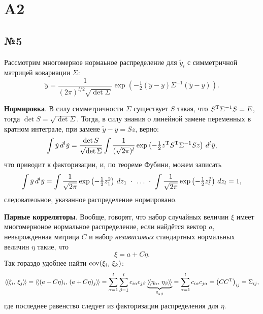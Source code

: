 
\section{A2}

\subsection*{№5}


Рассмотрим многомерное нормаьное распределение для $\tilde{y}_i$ с симметричной матрицей ковариации $\Sigma$:
\begin{equation*}
    \tilde{y} = \frac{1}{(2\pi)^{l/2} \sqrt{\det \Sigma}} \exp\left(
        - \tfrac{1}{2} (\tilde{y}-y) \Sigma^{-1} (\tilde{y} - y)
    \right).
\end{equation*}

\textbf{Нормировка}. В силу симметричности $\Sigma$ существует $S$ такая, что $S^{\text{T}} \Sigma^{-1} S = E$, тогда $\det S = \sqrt{\det \Sigma}$. Тогда, в силу знания о линейной замене переменных в кратном интеграле, при замене $\tilde{y} - y = Sz$, верно:
\begin{equation*}
    \int \tilde{y} \, d^l \tilde{y} =  
    \frac{\det S}{\sqrt{\det \Sigma}} \int 
    \frac{1}{(\sqrt{2\pi})^l} \exp\left(
        - \tfrac{1}{2} z^{\text{T}} S^{\text{T}} \Sigma^{-1} S z
    \right)
    \, d^l \tilde{y},
\end{equation*}
что приводит к факторизации, и, по теореме Фубини, можем записать
\begin{equation*}
    \int \tilde{y} \, d^l \tilde{y} = 
    \int \frac{1}{\sqrt{2\pi}} \exp\left(-\tfrac{1}{2} z_1^2 \right) \, d z_1 
    \ \cdot \
    \ldots
    \ \cdot \
    \int \frac{1}{\sqrt{2\pi}} \exp\left(-\tfrac{1}{2} z_l^2 \right) \, d z_l = 1,
\end{equation*}
следовательное, указанное распределение нормировано.


\textbf{Парные корреляторы}. Вообще, говорят, что набор случайных величин $\xi$ имеет многомерноное нормальное распределение, если найдётся вектор $a$, невырожденная матрица $C$ и набор \textit{независимых} стандартных нормальных величин $\eta$ такие, что
\begin{equation*}
    \xi = a + C \eta.
\end{equation*}
Так гораздо удобнее найти $\mathop{\mathrm{cov}}\nolimits (\xi_i,\, \xi_k)$:
\begin{equation*}
    \langle\hspace{-1.2pt}\langle \xi_i,\, \xi_j \rangle\hspace{-1.2pt}\rangle = \langle\hspace{-1.2pt}\langle (a + C \eta)_i,\, (a + C \eta)_j \rangle\hspace{-1.2pt}\rangle = 
    \sum_{\alpha=1}^{l} \sum_{\beta=1}^{l} c_{i \alpha} c_{j \beta} 
    \underbrace{\langle\hspace{-1.2pt}\langle \eta_{\alpha},\, \eta_\beta \rangle\hspace{-1.2pt}\rangle}_{\delta_{\alpha \beta}} = 
    \sum_{\alpha=1}^{l} c_{i\alpha} c_{j \alpha} = \left(C C^{\text{T}}\right)_{ij} = \Sigma_{ij},
\end{equation*}
где последнее равенство следует из факторизации распределения для $\eta$. 


